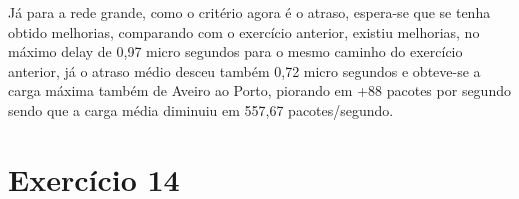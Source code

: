 \documentclass[pdftex,12pt,a4paper]{report}
\begin{document}
Já para a rede grande, como o critério agora é o atraso, espera-se que se tenha obtido melhorias, comparando com o exercício anterior, existiu melhorias, no máximo delay de 0,97 micro segundos para o mesmo caminho do exercício anterior, já o atraso médio desceu também 0,72 micro segundos e obteve-se a carga máxima também de Aveiro ao Porto, piorando em +88 pacotes por segundo sendo que a carga média diminuiu em 557,67 pacotes/segundo.








\section{Exercício 14}
\end{document}
